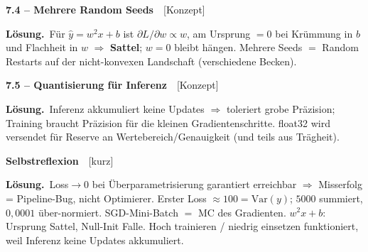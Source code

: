 \documentclass[a4paper,10pt]{article}
\newcommand{\aufg}[2]{%
  \par\vspace{4pt}
  {\bfseries\color{accent2} #1}~~{\footnotesize\color{rulecol}[#2]}\par\vspace{1pt}}
\newcommand{\loes}{\textbf{\color{good}Lösung.}~}
\newcommand{\erg}[1]{\textcolor{good}{\textbf{#1}}}
\begin{document}
\aufg{7.4 \;--\; Mehrere Random Seeds}{Konzept}
\loes Für $\hat y=w^2x+b$ ist $\partial L/\partial w\propto w$, am Ursprung $=0$ bei
Krümmung in $b$ und Flachheit in $w$ $\Rightarrow$ \erg{Sattel}; $w=0$ bleibt hängen.
Mehrere Seeds $=$ Random Restarts auf der nicht-konvexen Landschaft (verschiedene Becken).

\aufg{7.5 \;--\; Quantisierung für Inferenz}{Konzept}
\loes Inferenz akkumuliert keine Updates $\Rightarrow$ toleriert grobe Präzision;
Training braucht Präzision für die kleinen Gradientenschritte. float32 wird versendet
für Reserve an Wertebereich/Genauigkeit (und teils aus Trägheit).

\aufg{Selbstreflexion}{kurz}
\loes Loss$\to0$ bei Überparametrisierung garantiert erreichbar $\Rightarrow$ Misserfolg
= Pipeline-Bug, nicht Optimierer. Erster Loss $\approx100=\mathrm{Var}(y)$; $5000$
summiert, $0{,}0001$ über-normiert. SGD-Mini-Batch $=$ MC des Gradienten. $w^2x+b$:
Ursprung Sattel, Null-Init Falle. Hoch trainieren / niedrig einsetzen funktioniert, weil
Inferenz keine Updates akkumuliert.
\end{document}
